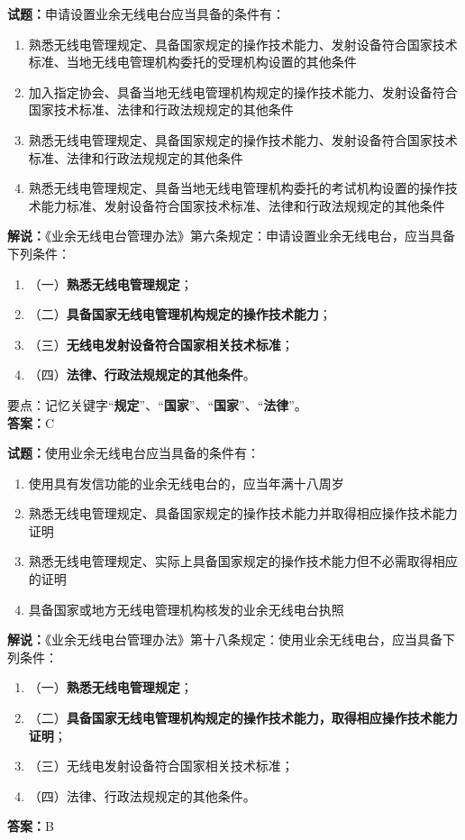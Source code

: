 \documentclass{ctexbook}
\begin{document}
\bigskip




\noindent\textbf{试题：}申请设置业余无线电台应当具备的条件有：
\begin{enumerate}[leftmargin=3em]
\item 熟悉无线电管理规定、具备国家规定的操作技术能力、发射设备符合国家技术标准、当地无线电管理机构委托的受理机构设置的其他条件
\item 加入指定协会、具备当地无线电管理机构规定的操作技术能力、发射设备符合国家技术标准、法律和行政法规规定的其他条件
\item 熟悉无线电管理规定、具备国家规定的操作技术能力、发射设备符合国家技术标准、法律和行政法规规定的其他条件
\item 熟悉无线电管理规定、具备当地无线电管理机构委托的考试机构设置的操作技术能力标准、发射设备符合国家技术标准、法律和行政法规规定的其他条件
\end{enumerate}
\noindent\textbf{解说：}《业余无线电台管理办法》第六条规定：申请设置业余无线电台，应当具备下列条件：
\begin{enumerate}[label=, leftmargin=0.8em]
	\item （一）\textbf{熟悉无线电管理规定}；
	\item （二）\textbf{具备国家无线电管理机构规定的操作技术能力}；
	\item （三）\textbf{无线电发射设备符合国家相关技术标准}；
	\item （四）\textbf{法律、行政法规规定的其他条件}。
\end{enumerate}
要点：记忆关键字“\textbf{规定}”、“\textbf{国家}”、“\textbf{国家}”、“\textbf{法律}”。\\\noindent\textbf{答案：}C

\bigskip




\noindent\textbf{试题：}使用业余无线电台应当具备的条件有：
\begin{enumerate}[leftmargin=3em]
\item 使用具有发信功能的业余无线电台的，应当年满十八周岁
\item 熟悉无线电管理规定、具备国家规定的操作技术能力并取得相应操作技术能力证明
\item 熟悉无线电管理规定、实际上具备国家规定的操作技术能力但不必需取得相应的证明
\item 具备国家或地方无线电管理机构核发的业余无线电台执照
\end{enumerate}
\noindent\textbf{解说：}《业余无线电台管理办法》第十八条规定：使用业余无线电台，应当具备下列条件：
\begin{enumerate}[label=, leftmargin=0.8em]
	\item （一）\textbf{熟悉无线电管理规定}；
	\item （二）\textbf{具备国家无线电管理机构规定的操作技术能力，取得相应操作技术能力证明}；
	\item （三）无线电发射设备符合国家相关技术标准；
	\item （四）法律、行政法规规定的其他条件。
\end{enumerate}
\noindent\textbf{答案：}B
\end{document}
